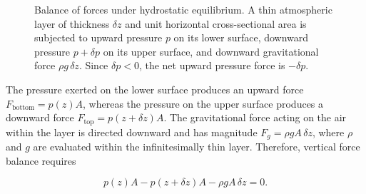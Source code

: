 \documentclass[10pt,twocolumn]{memoir}
\begin{document}
\begin{figure}[t]
{%
}
\caption{Balance of forces under hydrostatic equilibrium. A thin atmospheric layer of thickness $\delta z$ and unit horizontal cross-sectional area is subjected to upward pressure $p$ on its lower surface, downward pressure $p+\delta p$ on its upper surface, and downward gravitational force $\rho g\,\delta z$. Since $\delta p<0$, the net upward pressure force is $-\delta p$.}
\label{fig:c1_hydrostatic_balance}
\end{figure}

The pressure exerted on the lower surface produces an upward force $F_{\mathrm{bottom}}=p(z)A$, whereas the pressure on the upper surface produces a downward force $F_{\mathrm{top}}=p(z+\delta z)A$. The gravitational force acting on the air within the layer is directed downward and has magnitude $F_g=\rho gA\,\delta z$, where $\rho$ and $g$ are evaluated within the infinitesimally thin layer. Therefore, vertical force balance requires

\begin{equation}
    p(z)A-p(z+\delta z)A-\rho gA\,\delta z=0.
\end{equation}
\end{document}
